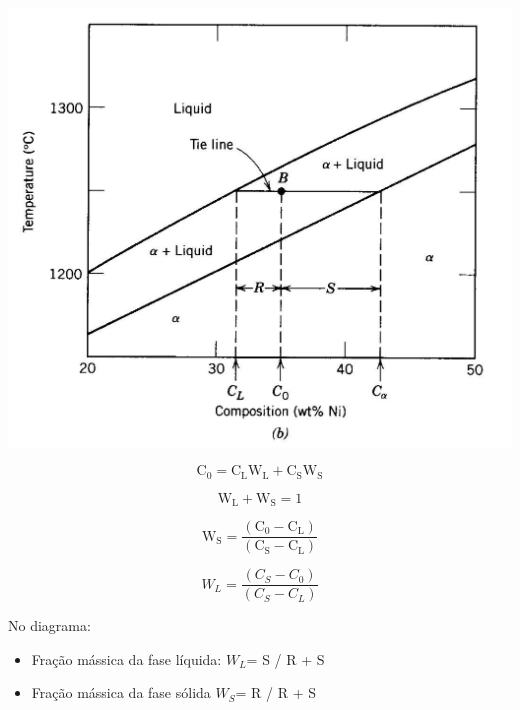 \includegraphics[scale=0.4,trim={0 0 0 0}]{figures/binIso2}

\begin{equation}\label{key}
\mathrm{C}_{0}=\mathrm{C}_{\mathrm{L}} \mathrm{W}_{\mathrm{L}}+\mathrm{C}_{\mathrm{S}} \mathrm{W}_{\mathrm{S}}
\end{equation}

\begin{equation}\label{key}
\mathrm{W}_{\mathrm{L}}+\mathrm{W}_{\mathrm{S}}=1
\end{equation}

\begin{equation}\label{key}
\mathrm{W}_{\mathrm{S}}=\frac{\left(\mathrm{C}_{0}-\mathrm{C}_{\mathrm{L}}\right) }{\left(\mathrm{C}_{\mathrm{S}}-\mathrm{C}_{\mathrm{L}}\right)}
\end{equation}

\begin{equation}\label{key}
W_{L}=\frac{\left(C_{S}-C_{0}\right) }{\left(C_{S}-C_{L}\right)}
\end{equation}

No diagrama:

\begin{itemize}
	\item Fração mássica da fase líquida: $W_{L}$= S / R + S
	\item Fração mássica da fase sólida $W_{S}$= R / R + S
\end{itemize}



